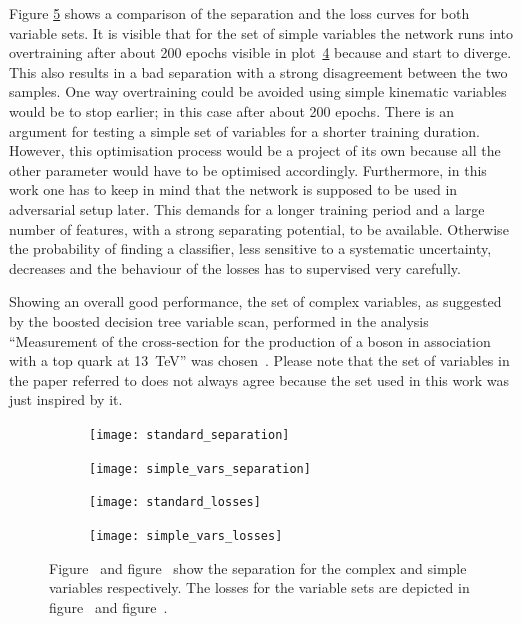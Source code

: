 %
Figure \ref{fig:vars} shows a comparison of the separation and the loss curves for both variable sets. It is visible that for the set of simple variables the network runs into overtraining after about \num{200} epochs visible in plot~\ref{fig:vars:simple:loss} because \losstrain and \losstest start to diverge. This also results in a bad separation with a strong disagreement between the two samples. One way overtraining could be avoided using simple kinematic variables would be to stop earlier; in this case after about 200 epochs. There is an argument for testing a simple set of variables for a shorter training duration. However, this optimisation process would be a project of its own because all the other parameter would have to be optimised accordingly. Furthermore, in this work one has to keep in mind that the network is supposed to be used in adversarial setup later. This demands for a longer training period and a large number of features, with a strong separating potential, to be available. Otherwise the probability of finding a classifier, less sensitive to a systematic uncertainty, decreases and the behaviour of the losses has to supervised very carefully.

Showing an overall good performance, the set of complex variables, as suggested by the boosted decision tree variable scan, performed in the analysis \enquote{Measurement of the cross-section for the production of a \PW boson in association with a top quark at \SI{13}{\tera \electronvolt}} was chosen~\cite{Finelli:2667560}. Please note that the set of variables in the paper referred to does not always agree because the set used in this work was just inspired by it.

\begin{figure}[htbp]
    \centering
    \begin{subfigure}[b]{0.45\textwidth}
        \texttt{[image: standard\_separation]}
        \caption{}
        \label{fig:vars:standard:sep}
    \end{subfigure}
\quad
    \begin{subfigure}[b]{0.45\textwidth}
        \texttt{[image: simple\_vars\_separation]}
        \caption{}
        \label{fig:vars:simple:sep}
    \end{subfigure}

    \begin{subfigure}[b]{0.45\textwidth}
		\texttt{[image: standard\_losses]}
		\caption{}
		\label{fig:vars:standard:loss}
	\end{subfigure}
\quad
	\begin{subfigure}[b]{0.45\textwidth}
		\texttt{[image: simple\_vars\_losses]}
		\caption{}
		\label{fig:vars:simple:loss}
	\end{subfigure}
    \caption[Performance of the classifier using different variables]{Figure~ and figure~ show the separation for the complex and simple variables respectively. The losses for the variable sets are depicted in figure~ and figure~.}
	\label{fig:vars}
\end{figure}





